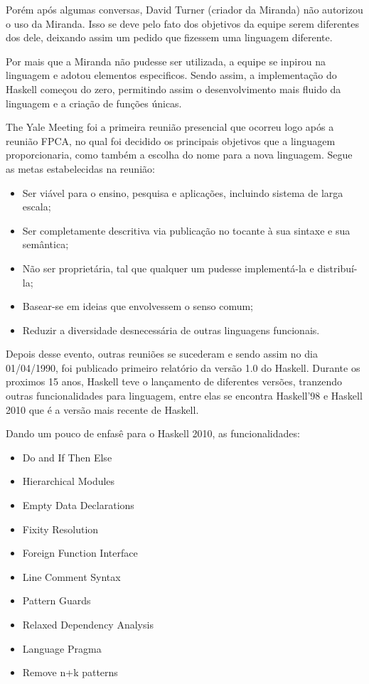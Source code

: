 \documentclass[
	article,			%
	11pt,				%
	oneside,			%
	a4paper,			%
	english,			%
	brazil,				%
	sumario=tradicional
	]{abntex2}
\begin{document}
    Porém após algumas conversas, David Turner (criador da Miranda) não autorizou o uso da Miranda. Isso se deve pelo fato dos objetivos
    da equipe serem diferentes dos dele, deixando assim um pedido que fizessem uma linguagem diferente.

    Por mais que a Miranda não pudesse ser utilizada, a equipe se inpirou na linguagem e adotou elementos especificos.  
    Sendo assim, a implementação do Haskell começou do zero, permitindo assim o desenvolvimento mais fluido da linguagem 
    e a criação de funções únicas.
    
    The Yale Meeting foi a primeira reunião presencial que ocorreu logo após a reunião FPCA, no qual foi decidido
    os principais objetivos que a linguagem proporcionaria, como também a escolha do nome para a nova linguagem. 
    Segue as metas estabelecidas na reunião:

    \begin{itemize}
      \item Ser viável para o ensino, pesquisa e aplicações, incluindo sistema de larga escala;
      \item Ser completamente descritiva via publicação no tocante à sua sintaxe e sua semântica;
      \item Não ser proprietária, tal que qualquer um pudesse implementá-la e distribuí-la;
      \item Basear-se em ideias que envolvessem o senso comum;
      \item Reduzir a diversidade desnecessária de outras linguagens funcionais.
    \end{itemize}

    Depois desse evento, outras reuniões se sucederam e sendo assim no dia 01/04/1990, foi publicado primeiro relatório
    da versão 1.0 do Haskell. Durante os proximos 15 anos, Haskell teve o lançamento de diferentes versões, tranzendo outras
    funcionalidades para linguagem, entre elas se encontra Haskell'98 e Haskell 2010 que é a versão mais recente de Haskell.  

    Dando um pouco de enfasê para o Haskell 2010, as funcionalidades:
    
    \begin{itemize}
      \item Do and If Then Else 
      \item Hierarchical Modules
      \item Empty Data Declarations
      \item Fixity Resolution 
      \item Foreign Function Interface
      \item Line Comment Syntax
      \item Pattern Guards
      \item Relaxed Dependency Analysis
      \item Language Pragma
      \item Remove n+k patterns
    \end{itemize}
\end{document}
